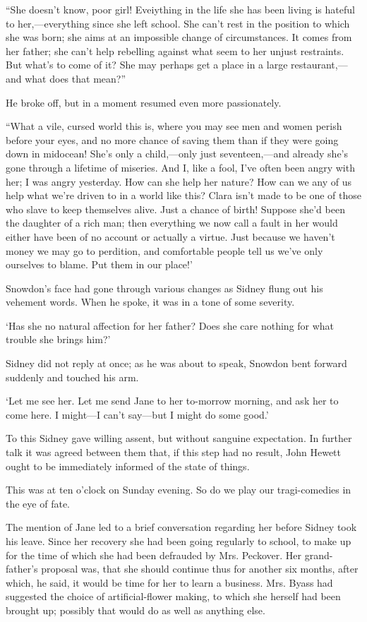 ``She doesn't know, poor girl! Eveiything in the life she has been
living is hateful to her,---everything since she left school. She can't
rest in the position to which she was born; she aims at an impossible
change of circumstances. It comes from her father; she can't help
rebelling against what seem to her unjust restraints. But what's to come
of it? She may perhaps get a place in a large restaurant,---and what
does that mean?''

He broke off, but in a moment resumed even more passionately.

``What a vile, cursed world this is, where you may see men and women
perish before your eyes, and no more chance of saving them than if they
were going down in midocean! She's only a child,---only just
seventeen,---and already she's gone through a lifetime of miseries. And
I, like a fool, I've {\protect\hypertarget{249}{}{}}often been angry
with her; I was angry yesterday. How can she help her nature? How can we
any of us help what we're driven to in a world like this? Clara isn't
made to be one of those who slave to keep themselves alive. Just a
chance of birth! Suppose she'd been the daughter of a rich man; then
everything we now call a fault in her would either have been of no
account or actually a virtue. Just because we haven't money we may go to
perdition, and comfortable people tell us we've only ourselves to blame.
Put them in our place!'

Snowdon's face had gone through various changes as Sidney flung out his
vehement words. When he spoke, it was in a tone of some severity.

`Has she no natural affection for her father? Does she care nothing for
what trouble she brings him?'

Sidney did not reply at once; as he was about to speak, Snowdon bent
forward suddenly and touched his arm.

`Let me see her. Let me send Jane to {\protect\hypertarget{250}{}{}}her
to-morrow morning, and ask her to come here. I might---I can't say---but
I might do some good.'

To this Sidney gave willing assent, but without sanguine expectation. In
further talk it was agreed between them that, if this step had no
result, John Hewett ought to be immediately informed of the state of
things.

This was at ten o'clock on Sunday evening. So do we play our
tragi-comedies in the eye of fate.

The mention of Jane led to a brief conversation regarding her before
Sidney took his leave. Since her recovery she had been going regularly
to school, to make up for the time of which she had been defrauded by
Mrs. Peckover. Her grand-father's proposal was, that she should continue
thus for another six months, after which, he said, it would be time for
her to learn a business. Mrs. Byass had suggested the choice of
artificial-flower making, to which she herself had been brought up;
possibly that would do as well as anything else.


